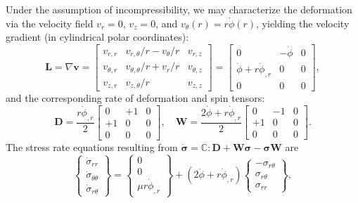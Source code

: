 Under the assumption of incompressibility, we may characterize the deformation via the velocity field $v_r = 0$, $v_z = 0$, and $v_\theta (r) = r \dot{\phi}(r)$, yielding the velocity gradient (in cylindrical polar coordinates):
\begin{equation}
  \mathbf{L} = \nabla \mathbf{v} = \left[ \begin{array}{ccc} v_{r,r} & v_{r,\theta}/r-v_\theta /r & v_{r,z} \\
      v_{\theta,r} & v_{\theta,\theta}/r + v_r /r & v_{\theta,z} \\
      v_{z,r} & v_{z,\theta} /r & v_{z,z} \end{array} \right] = 
  \left[ \begin{array}{ccc} 0 & -\dot{\phi} & 0 \\
      \dot{\phi} + r \dot{\phi}_{,r} & 0 & 0 \\
      0 & 0 & 0 \end{array} \right],
\end{equation}
and the corresponding rate of deformation and spin tensors:
\begin{equation}
  \mathbf{D} = \frac{r \dot{\phi}_{,r}}{2} \left[ \begin{array}{ccc} 0 & +1 & 0 \\
      +1 & 0 & 0 \\
      0 & 0 & 0 \end{array} \right], \quad \mathbf{W} = 
  \frac{2 \dot{\phi} + r \dot{\phi}_{,r}}{2} \left[ \begin{array}{ccc} 0 & - 1 & 0 \\
      +1 & 0 & 0 \\
      0 & 0 & 0 \end{array} \right].
\end{equation}
The stress rate equations resulting from $\dot{\boldsymbol{\sigma}} = \mathbb{C} : \mathbf{D} + \mathbf{W} \boldsymbol{\sigma} - \boldsymbol{\sigma} \mathbf{W}$ are
\begin{equation}
  \left\{ \begin{array}{c} \dot{\sigma}_{rr} \\ \dot{\sigma}_{\theta \theta} \\ \dot{\sigma}_{r \theta} \end{array} \right\} = \left\{ \begin{array}{c} 0 \\ 0 \\ \mu r \dot{\phi}_{,r} \end{array} \right\} + 
  (2 \dot{\phi} + r \dot{\phi}_{,r}) \left\{ \begin{array}{c} - \sigma_{r \theta} \\ \sigma_{r \theta} \\ \sigma_{rr} \end{array} \right\},
\end{equation}
